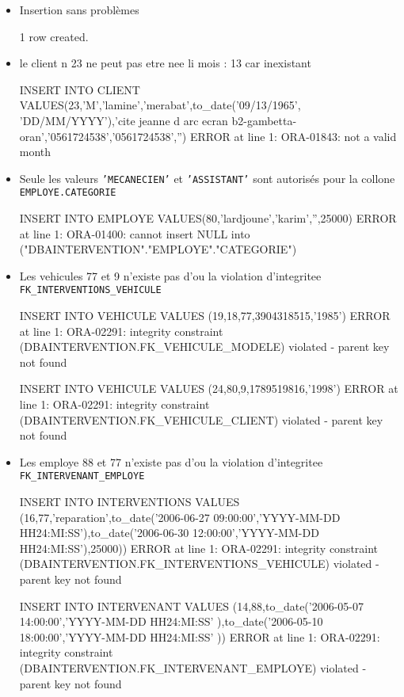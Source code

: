 \documentclass[•]{article}
\begin{document}
\begin{itemize}
    \item Insertion sans problèmes
    \begin{sql}
    1 row created.
    \end{sql}
    \item le client n 23 ne peut pas etre nee li mois : 13 car inexistant
    \begin{sql}
    INSERT INTO CLIENT VALUES(23,'M','lamine','merabat',to_date('09/13/1965', 'DD/MM/YYYY'),'cite jeanne d arc ecran b2-gambetta-oran','0561724538','0561724538','')
    ERROR at line 1:
    ORA-01843: not a valid month
    \end{sql}
    \item Seule les valeurs \texttt{'MECANECIEN'} et \texttt{'ASSISTANT'} sont autorisés pour la collone \texttt{EMPLOYE.CATEGORIE}
    \begin{sql}
    INSERT INTO EMPLOYE VALUES(80,'lardjoune','karim','',25000)
    ERROR at line 1:
    ORA-01400: cannot insert NULL into ("DBAINTERVENTION"."EMPLOYE"."CATEGORIE") 
    \end{sql}
    \item Les vehicules 77 et 9 n'existe pas d'ou la violation d'integritee \texttt{FK\_INTERVENTIONS\_VEHICULE}
    \begin{sql}
    INSERT INTO VEHICULE VALUES (19,18,77,3904318515,'1985')
    ERROR at line 1:
    ORA-02291: integrity constraint (DBAINTERVENTION.FK_VEHICULE_MODELE) violated - parent key not found 
    
    INSERT INTO VEHICULE VALUES (24,80,9,1789519816,'1998')
    ERROR at line 1:
    ORA-02291: integrity constraint (DBAINTERVENTION.FK_VEHICULE_CLIENT) violated - parent key not found 
    \end{sql}
    \item Les employe 88 et 77 n'existe pas d'ou la violation d'integritee \texttt{FK\_INTERVENANT\_EMPLOYE}
    \begin{sql}
    INSERT INTO INTERVENTIONS VALUES (16,77,'reparation',to_date('2006-06-27 09:00:00','YYYY-MM-DD HH24:MI:SS'),to_date('2006-06-30 12:00:00','YYYY-MM-DD HH24:MI:SS'),25000))
    ERROR at line 1:
    ORA-02291: integrity constraint (DBAINTERVENTION.FK_INTERVENTIONS_VEHICULE) violated - parent key not found 
    
    INSERT INTO INTERVENANT VALUES (14,88,to_date('2006-05-07 14:00:00','YYYY-MM-DD HH24:MI:SS' ),to_date('2006-05-10 18:00:00','YYYY-MM-DD HH24:MI:SS' ))
    ERROR at line 1:
    ORA-02291: integrity constraint (DBAINTERVENTION.FK_INTERVENANT_EMPLOYE) violated - parent key not found 
    \end{sql}
\end{itemize}
\end{document}
